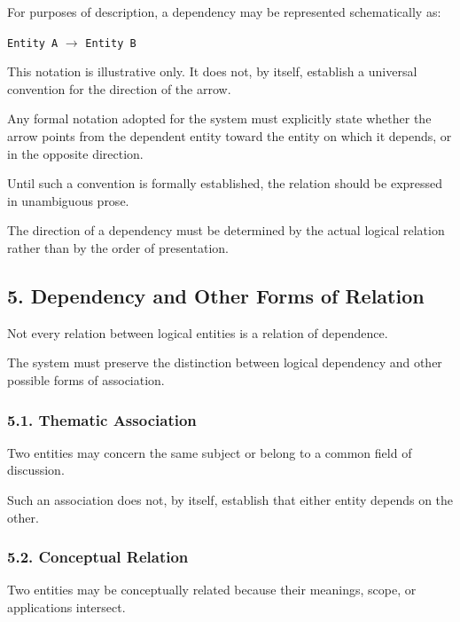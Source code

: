 For purposes of description, a dependency
may be represented schematically as:

\begin{center}
    \texttt{Entity A} $\longrightarrow$
    \texttt{Entity B}
\end{center}

This notation is illustrative only.
It does not, by itself, establish a
universal convention for the direction
of the arrow.

Any formal notation adopted for the
system must explicitly state whether
the arrow points from the dependent
entity toward the entity on which
it depends, or in the opposite direction.

Until such a convention is formally
established, the relation should be
expressed in unambiguous prose.

The direction of a dependency must
be determined by the actual logical
relation rather than by the order
of presentation.


\subsection*{5. Dependency and Other Forms of Relation}

Not every relation between logical
entities is a relation of dependence.

The system must preserve the distinction
between logical dependency and other
possible forms of association.

\subsubsection*{5.1. Thematic Association}

Two entities may concern the same
subject or belong to a common field
of discussion.

Such an association does not,
by itself, establish that either
entity depends on the other.

\subsubsection*{5.2. Conceptual Relation}

Two entities may be conceptually
related because their meanings,
scope, or applications intersect.

